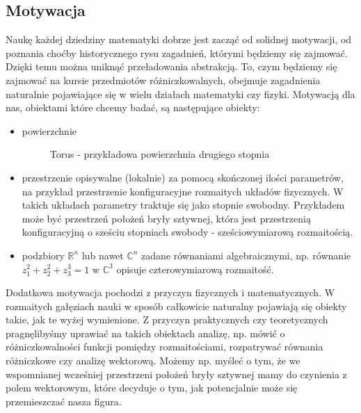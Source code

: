 \subsection{Motywacja}
Naukę każdej dziedziny matematyki dobrze jest zacząć od solidnej motywacji, od poznania choćby historycznego rysu zagadnień, którymi będziemy się zajmować. Dzięki temu można uniknąć przeładowania abstrakcją. To, czym będziemy się zajmować na kursie przedmiotów różniczkowalnych, obejmuje zagadnienia naturalnie pojawiające się w wielu działach matematyki czy fizyki. Motywacją dla nas, obiektami które chcemy badać, są następujące obiekty:
\begin{itemize}
	\item powierzchnie
		\begin{figure}[ht]
			    \centering
			    \caption{Torus - przykładowa powierzchnia drugiego stopnia}
			    \label{fig:torus}
		\end{figure}
	\item przestrzenie opisywalne (lokalnie) za pomocą skończonej ilości parametrów, na przykład przestrzenie konfiguracyjne rozmaitych układów fizycznych. W takich układach parametry traktuje się jako stopnie swobodny. Przykładem może być przestrzeń położeń bryły sztywnej, która jest przestrzenią konfiguracyjną o sześciu stopniach swobody - sześciowymiarową rozmaitością.

	\item podzbiory $\mathbb{R}^n$ lub nawet $\mathbb{C}^n$ zadane równaniami algebraicznymi, np. równanie $z_1^2 + z_2^2 + z_3^3 = 1$ w $\mathbb{C}^3$ opisuje czterowymiarową rozmaitość.
\end{itemize}
Dodatkowa motywacja pochodzi z przyczyn fizycznych i matematycznych. W rozmaitych gałęziach nauki w sposób całkowicie naturalny pojawiają się obiekty takie, jak te wyżej wymienione. Z przyczyn praktycznych czy teoretycznych pragnęlibyśmy uprawiać na takich obiektach analizę, np. mówić o różniczkowalności funkcji pomiędzy rozmaitościami, rozpatrywać równania różniczkowe czy analizę wektorową. Możemy np. myśleć o tym, że we wspomnianej wcześniej przestrzeni położeń bryły sztywnej mamy do czynienia z polem wektorowym, które decyduje o tym, jak potencjalnie może się przemieszczać nasza figura.

